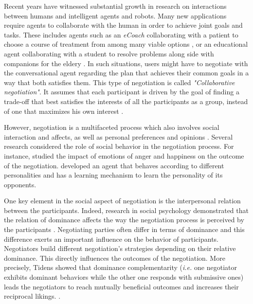 \documentclass[conference, letterpaper]{IEEEtran}
\begin{document}
		Recent years have witnessed substantial growth in research on interactions between humans and intelligent agents and robots. Many new applications require agents to collaborate with the human in order to achieve joint goals and tasks. These includes agents such as an \textit{eCoach} collaborating with a patient to choose a course of treatment from among many viable options \cite{robertson2015visual}, or an educational agent collaborating with a student to resolve problems \cite{howard2017shifting} along side with companions for the eldery \cite{bickmore2005s}. In such situations, users might have to negotiate with the conversational agent regarding the plan that achieves their common goals in a way that both satisfies them. This type of negotiation is called \emph{"Collaborative negotiation"}. It assumes that each participant is driven by the goal of finding a trade-off that best satisfies the interests of all the participants as a group, instead of one that maximizes his own interest \cite{sidner1994artificial,chu1995response}.
	
	
		However, negotiation is a multifaceted process which also involves social interaction and affects, as well as personal preferences and opinions  \cite{bro2010affective}. Several research considered the role of social behavior in the negotiation process. For instance, \cite{de2011effect} studied the impact of emotions of anger and happiness on the outcome of the negotiation.  \cite{kraus1995designing} developed an agent that behaves according to different personalities and has a learning mechanism to learn the personality of its opponents. 
	
		One key element in the social aspect of negotiation is the interpersonal relation between the participants. Indeed, research in social psychology demonstrated that the relation of dominance affects the way the negotiation process is perceived by the participants \cite{van2006power}.  
		Negotiating parties often differ in terms of dominance and this difference exerts an important influence on the behavior of participants. Negotiators build different negotiation's strategies depending on their relative dominance. This directly influences the outcomes of the negotiation. More precisely, Tidens \cite{tiedens2003power} showed that dominance complementarity (\emph{i.e.} one negotiator exhibits dominant behaviors while the other one responds with submissive ones) leads the negotiators to reach mutually beneficial outcomes and increases their reciprocal likings. \cite{wiltermuth2015benefits,tiedens2003power}.
	
\end{document}
